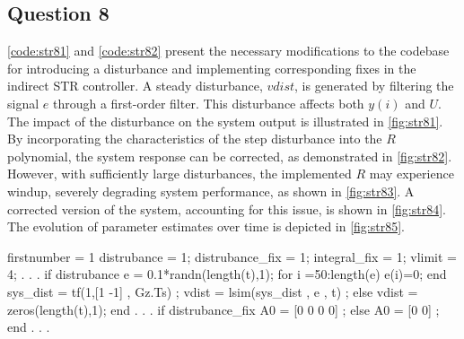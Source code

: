 \FloatBarrier
\subsection{Question 8}
\autoref{code:str81} and \autoref{code:str82} present the necessary modifications to the codebase for introducing a disturbance and implementing corresponding fixes in the indirect STR controller. A steady disturbance, $vdist$, is generated by filtering the signal $e$ through a first-order filter. This disturbance affects both $y(i)$ and $U$. The impact of the disturbance on the system output is illustrated in \autoref{fig:str81}. By incorporating the characteristics of the step disturbance into the $R$ polynomial, the system response can be corrected, as demonstrated in \autoref{fig:str82}. However, with sufficiently large disturbances, the implemented $R$ may experience windup, severely degrading system performance, as shown in \autoref{fig:str83}. A corrected version of the system, accounting for this issue, is shown in \autoref{fig:str84}. The evolution of parameter estimates over time is depicted in \autoref{fig:str85}.


\begin{code}
	\begin{matlabcode}{firstnumber = 1}
distrubance = 1; %
distrubance_fix = 1; %
integral_fix = 1; %
vlimit = 4; %
		. . .
if distrubance
	e = 0.1*randn(length(t),1);
	for i =50:length(e)
		e(i)=0;
	end
	sys_dist = tf(1,[1 -1] , Gz.Ts) ;
	vdist = lsim(sys_dist , e , t) ;
else
	vdist = zeros(length(t),1);
end
. . .
if distrubance_fix
	A0 = [0 0 0 0] ;
else
	A0 = [0 0] ;
end
. . .
	\end{matlabcode}
	\label{code:str81}
\end{code}

